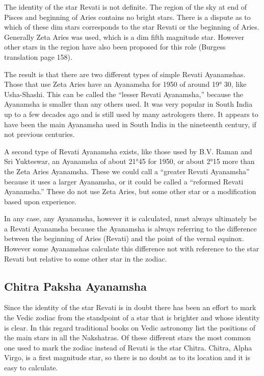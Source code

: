  

The identity of the star Revati is not definite. The region of the sky at end of Pisces and beginning of Aries contains no bright stars. There is a dispute as to which of these dim stars corresponds to the star Revati or the beginning of Aries. Generally Zeta Aries was used, which is a dim fifth magnitude star. However other stars in the region have also been proposed for this role (Burgess translation page 158).

 

The result is that there are two different types of simple Revati Ayanamshas. Those that use Zeta Aries have an Ayanamsha for 1950 of around 19° 30, like Usha-Shashi. This can be called the “lesser Revati Ayanamsha,” because the Ayanamsha is smaller than any others used. It was very popular in South India up to a few decades ago and is still used by many astrologers there. It appears to have been the main Ayanamsha used in South India in the nineteenth century, if not previous centuries.

 

A second type of Revati Ayanamsha exists, like those used by B.V. Raman and Sri Yukteswar, an Ayanamsha of about 21°45 for 1950, or about 2°15 more than the Zeta Aries Ayanamsha. These we could call a “greater Revati Ayanamsha” because it uses a larger Ayanamsha, or it could be called a “reformed Revati Ayanamsha.” These do not use Zeta Aries, but some other star or a modification based upon experience.

 

In any case, any Ayanamsha, however it is calculated, must always ultimately be a Revati Ayanamsha because the Ayanamsha is always referring to the difference between the beginning of Aries (Revati) and the point of the vernal equinox. However some Ayanamshas calculate this difference not with reference to the star Revati but relative to some other star in the zodiac.

 

\subsection{Chitra Paksha Ayanamsha}

 

Since the identity of the star Revati is in doubt there has been an effort to mark the Vedic zodiac from the standpoint of a star that is brighter and whose identity is clear. In this regard traditional books on Vedic astronomy list the positions of the main stars in all the Nakshatras. Of these different stars the most common one used to mark the zodiac instead of Revati is the star Chitra. Chitra, Alpha Virgo, is a first magnitude star, so there is no doubt as to its location and it is easy to calculate.

